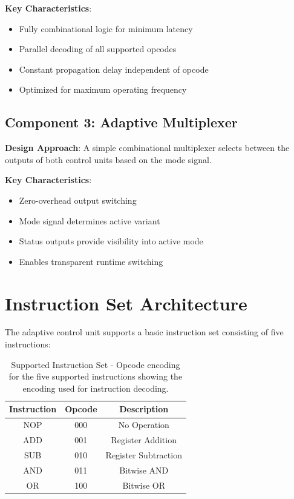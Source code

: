 \documentclass[15pt,a4paper]{report}
\begin{document}
\textbf{Key Characteristics}:
\begin{itemize}
    \item Fully combinational logic for minimum latency
    \item Parallel decoding of all supported opcodes
    \item Constant propagation delay independent of opcode
    \item Optimized for maximum operating frequency
\end{itemize}

\subsection{Component 3: Adaptive Multiplexer}

\textbf{Design Approach}: A simple combinational multiplexer selects between the outputs of both control units based on the mode signal.

\textbf{Key Characteristics}:
\begin{itemize}
    \item Zero-overhead output switching
    \item Mode signal determines active variant
    \item Status outputs provide visibility into active mode
    \item Enables transparent runtime switching
\end{itemize}

\section{Instruction Set Architecture}

The adaptive control unit supports a basic instruction set consisting of five instructions:

\begin{table}[H]
    \centering
    \begin{tabular}{|c|c|c|}
        \hline
        \textbf{Instruction} & \textbf{Opcode} & \textbf{Description} \\
        \hline
        NOP & 000 & No Operation \\
        \hline
        ADD & 001 & Register Addition \\
        \hline
        SUB & 010 & Register Subtraction \\
        \hline
        AND & 011 & Bitwise AND \\
        \hline
        OR & 100 & Bitwise OR \\
        \hline
    \end{tabular}
    \label{tab:isa}
    \caption{Supported Instruction Set - Opcode encoding for the five supported instructions showing the encoding used for instruction decoding.}
\end{table}
\end{document}
